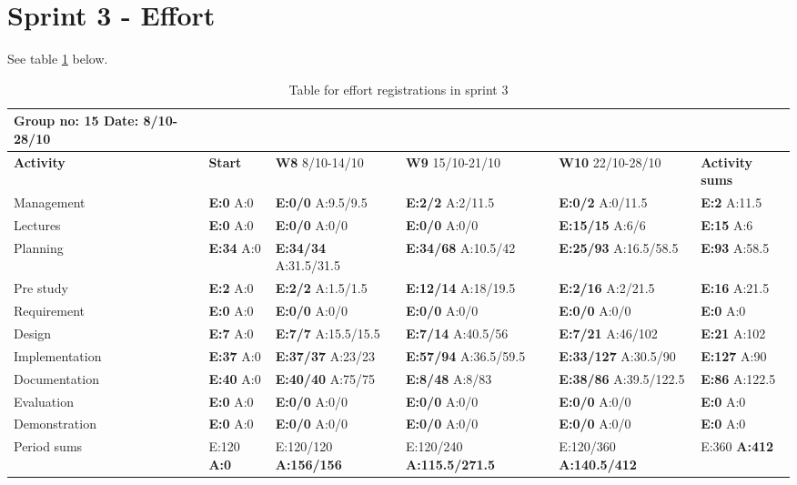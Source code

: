 \section{Sprint 3 - Effort}

See table \ref{tab:effortweekss3} below.

\begin{table}[htb]
\begin{tabularx}{\linewidth}{>{\setlength\hsize{.625\hsize}}X|>{\setlength\hsize{0.3\hsize}}X|>{\setlength\hsize{0.5\hsize}}X|>{\setlength\hsize{0.5\hsize}}X|>{\setlength\hsize{0.5\hsize}}X|>{\setlength\hsize{.3\hsize}}X}
Group no: 15 Date: 8/10-28/10  \\ \hline
\textbf{Activity} & \textbf{Start} & \textbf{W8} 8/10-14/10 & \textbf{W9} 15/10-21/10 & \textbf{W10} 22/10-28/10 & \textbf{Activity sums} \\ \hline \hline
Management & \textbf{E:0} A:0 & \textbf{E:0/0} A:9.5/9.5 & \textbf{E:2/2} A:2/11.5 & \textbf{E:0/2} A:0/11.5 & \textbf{E:2} A:11.5  \\ \hline
Lectures & \textbf{E:0} A:0 & \textbf{E:0/0} A:0/0 & \textbf{E:0/0} A:0/0 & \textbf{E:15/15} A:6/6 & \textbf{E:15} A:6  \\ \hline
Planning & \textbf{E:34} A:0 & \textbf{E:34/34} A:31.5/31.5 & \textbf{E:34/68} A:10.5/42 & \textbf{E:25/93} A:16.5/58.5 & \textbf{E:93} A:58.5  \\ \hline
Pre study & \textbf{E:2} A:0 & \textbf{E:2/2} A:1.5/1.5 & \textbf{E:12/14} A:18/19.5 & \textbf{E:2/16} A:2/21.5 & \textbf{E:16} A:21.5  \\ \hline
Requirement & \textbf{E:0} A:0 & \textbf{E:0/0} A:0/0 & \textbf{E:0/0} A:0/0 & \textbf{E:0/0} A:0/0 & \textbf{E:0} A:0 \\ \hline
Design & \textbf{E:7} A:0 & \textbf{E:7/7} A:15.5/15.5 & \textbf{E:7/14} A:40.5/56 & \textbf{E:7/21} A:46/102 & \textbf{E:21} A:102  \\ \hline
Implementation & \textbf{E:37} A:0 & \textbf{E:37/37} A:23/23 & \textbf{E:57/94} A:36.5/59.5 & \textbf{E:33/127} A:30.5/90 & \textbf{E:127} A:90  \\ \hline
Documentation & \textbf{E:40} A:0 & \textbf{E:40/40} A:75/75 & \textbf{E:8/48} A:8/83 & \textbf{E:38/86} A:39.5/122.5 & \textbf{E:86} A:122.5  \\ \hline
Evaluation & \textbf{E:0} A:0 & \textbf{E:0/0} A:0/0 & \textbf{E:0/0} A:0/0 & \textbf{E:0/0} A:0/0 & \textbf{E:0 } A:0  \\ \hline
Demonstration & \textbf{E:0} A:0 & \textbf{E:0/0} A:0/0 & \textbf{E:0/0} A:0/0 & \textbf{E:0/0} A:0/0 & \textbf{E:0 } A:0  \\ \hline
Period sums & E:120 \textbf{A:0} & E:120/120 \textbf{A:156/156} & E:120/240 \textbf{A:115.5/271.5} & E:120/360 \textbf{A:140.5/412} & E:360 \textbf{A:412} \\ \hline
\end{tabularx}

\caption{Table for effort registrations in sprint 3} \label{tab:effortweekss3}
\end{table}


